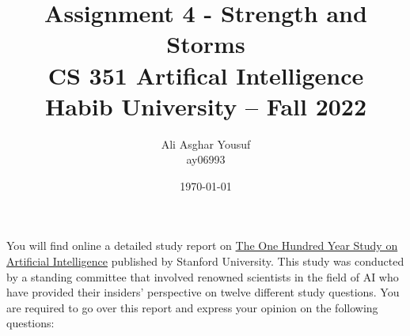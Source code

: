 \documentclass[answers]{exam}
\title{Assignment 4 - Strength and Storms\\ CS 351 Artifical Intelligence\\ Habib University -- Fall 2022}
\author{Ali Asghar Yousuf \\ ay06993}  %
\date{\today}
\begin{document}
\maketitle

\begin{questions}
    \question You will find online a detailed study report on \href{https://ai100.stanford.edu/sites/g/files/sbiybj18871/files/media/file/AI100Report_MT_10.pdf}{The One Hundred Year Study on Artificial Intelligence} published by Stanford University.
    This study was conducted by a standing committee that involved renowned scientists in the field of AI who have provided their insiders' perspective on twelve different study questions. You are required to go over this report and express your opinion on the following questions:


\end{questions}
\end{document}
